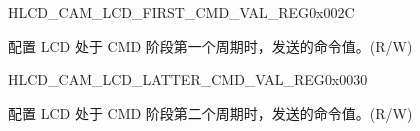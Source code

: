 \begin{register}{H}{LCD\_CAM\_LCD\_FIRST\_CMD\_VAL\_REG}{0x002C}\label{regdesc:LCDCAMLCDFIRSTCMDVALREG}
%
\regnewline%
\begin{regdesc}\begin{reglist}
\label{fielddesc:LCDCAMLCDFIRSTCMDVALUE}\item [LCD\_CAM\_LCD\_FIRST\_CMD\_VALUE] 配置 LCD 处于 CMD 阶段第一个周期时，发送的命令值。(R/W)
\end{reglist}\end{regdesc}
\end{register}

\begin{register}{H}{LCD\_CAM\_LCD\_LATTER\_CMD\_VAL\_REG}{0x0030}\label{regdesc:LCDCAMLCDLATTERCMDVALREG}
%
\regnewline%
\begin{regdesc}\begin{reglist}
\label{fielddesc:LCDCAMLCDLATTERCMDVALUE}\item [LCD\_CAM\_LCD\_LATTER\_CMD\_VALUE] 配置 LCD 处于 CMD 阶段第二个周期时，发送的命令值。(R/W)
\end{reglist}\end{regdesc}
\end{register}
